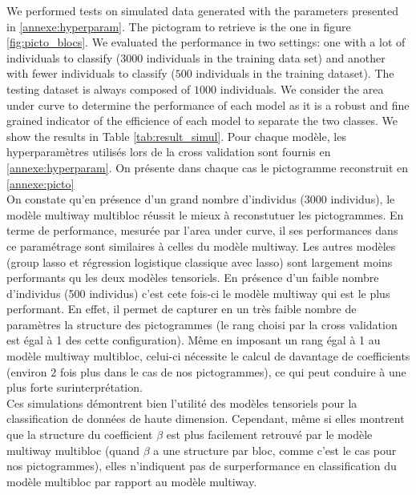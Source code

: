 \documentclass[preprint,12pt]{elsarticle}
\begin{document}
We performed tests on simulated data generated with the parameters presented in \ref{annexe:hyperparam}. The pictogram to retrieve is the one in figure \ref{fig:picto_blocs}. We evaluated the performance in two settings: one with a lot of individuals to classify ($3000$ individuals in the training data set) and another with fewer individuals to classify ($500$ individuals in the training dataset). The testing dataset is always composed of $1000$ individuals. We consider the area under curve to determine the performance of each model as it is a robust and fine grained indicator of the efficience of each model to separate the two classes. We show the results in Table \ref{tab:result_simul}. Pour chaque modèle, les hyperparamètres utilisés lors de la cross validation sont fournis en \ref{annexe:hyperparam}. On présente dans chaque cas le pictogramme reconstruit en \ref{annexe:picto}\\
\indent On constate qu'en présence d'un grand nombre d'individus (3000 individus), le modèle multiway multibloc réussit le mieux à reconstutuer les pictogrammes. En terme de performance, mesurée par l'area under curve, il ses performances dans ce paramétrage sont similaires à celles du modèle multiway. Les autres modèles (group lasso et régression logistique classique avec lasso) sont largement moins performants qu les deux modèles tensoriels.
En présence d'un faible nombre d'individus (500 individus) c'est cete fois-ci le modèle multiway qui est le plus performant. En effet, il permet de capturer en un très faible nombre de paramètres la structure des pictogrammes (le rang choisi par la cross validation est égal à 1 des cette configuration). Même en imposant un rang égal à 1 au modèle multiway multibloc, celui-ci nécessite le calcul de davantage de coefficients (environ $2$ fois plus dans le cas de nos pictogrammes), ce qui peut conduire à une plus forte surinterprétation.\\
\indent Ces simulations démontrent bien l'utilité des modèles tensoriels pour la classification de données de haute dimension. Cependant, même si elles montrent que la structure du coefficient $\beta$ est plus facilement retrouvé par le modèle multiway multibloc (quand $\beta$ a une structure par bloc, comme c'est le cas pour nos pictogrammes), elles n'indiquent pas de surperformance en classification du modèle multibloc par rapport au modèle multiway.\\
\end{document}
